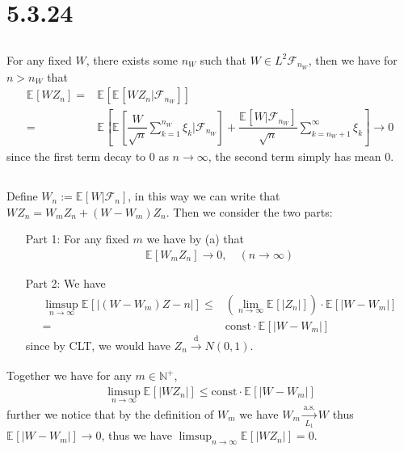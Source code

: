 \documentclass[11pt,a4paper]{ctexart}
\numberwithin{equation}{section}%
\newcommand{\F}{\mathcal{F}}
\begin{document}
\section{5.3.24}


\subsection{}

For any fixed $ W $, there  exists some $ n_W $ such that $ W\in L^2\F_{n_W} $, then we have for $ n> n_W $ that 
\begin{align*}
    \mathbb{E}_{  }\left[ WZ_n \right] =& \mathbb{E}_{  }\left[ \mathbb{E}_{  }\left[ WZ_n|\F_{n_W} \right]  \right]\\
    =& \mathbb{E}_{  }\left[ \mathbb{E}_{  }\left[ \dfrac{ W }{ \sqrt{n} }\sum_{k=1}^{n_W}\xi _k |\F_{n_W} \right]  + \dfrac{ \mathbb{E}_{  }\left[ W|\F_{n_W} \right]  }{ \sqrt{n} }\sum_{k={n_W+1}}^\infty \xi _k   \right] \to 0
\end{align*}
since the first term decay to $ 0 $ as $ n\to\infty $, the second term simply has mean 0.

\subsection{}

Define $ W_n:= \mathbb{E}_{  }\left[ W| \F_{n} \right] $, in this way we can write that $ WZ_n = W_mZ_n + (W-W_m)Z_n $. Then we consider the two parts:
\begin{itemize}[topsep=2pt,itemsep=0pt]
    \item[Part 1:] For any fixed $ m $ we have by (a) that
    \begin{align*}
        \mathbb{E}_{  }\left[ W_mZ_n \right] \to 0,\quad (n\to\infty) 
    \end{align*}
    \item[Part 2:] We have
    \begin{align*}
        \limsup_{n\to\infty} \mathbb{E}_{  }\left[ \left\vert (W-W_m)Z-n \right\vert  \right]  \leq & (\lim_{n\to\infty}\mathbb{E}_{  }\left[ \left\vert Z_n \right\vert  \right] )\cdot \mathbb{E}_{  }\left[ \left\vert W-W_m \right\vert  \right] \\
        =& \mathrm{const}\cdot \mathbb{E}_{  }\left[ \left\vert W-W_m \right\vert  \right] 
    \end{align*}
    since by CLT, we would have $ Z_n\xrightarrow[]{\mathrm{d}} N(0,1) $.
\end{itemize}
Together we have for any $ m\in \mathbb{N}^+ $, 
\begin{align*}
    \limsup_{n\to\infty} \mathbb{E}_{  }\left[ \left\vert WZ_n \right\vert  \right] \leq \mathrm{const}\cdot \mathbb{E}_{  }\left[ \left\vert W-W_m \right\vert  \right]
\end{align*}
further we notice that by the definition of $ W_m $ we have $ W_m\xrightarrow[L_1]{\mathrm{a.s.}} W $ thus $ \mathbb{E}_{  }\left[ \left\vert W-W_m \right\vert  \right] \to 0 $, thus we have $ \limsup_{n\to\infty} \mathbb{E}_{  }\left[ \left\vert WZ_n \right\vert  \right] =0 $.
\end{document}
